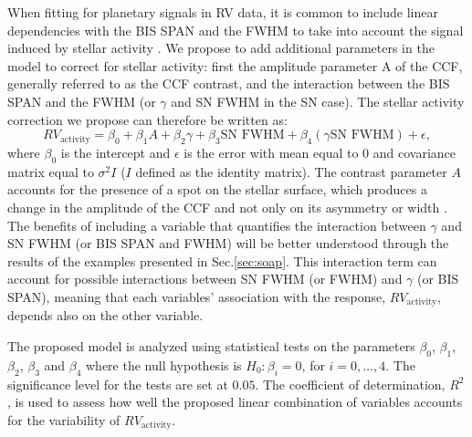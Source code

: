 \documentclass{aa}
\def\logrhk{$\log$(R$^{\prime}_{HK}$)}
\begin{document}
When fitting for planetary signals in RV data, it is common to include linear dependencies with the BIS SPAN and the FWHM to take into account the signal induced by stellar activity \citep[e.g.][]{Dumusque:2017aa,Feng:2017aa}.
We propose to add additional parameters in the model to correct for stellar activity: first the amplitude parameter A of the CCF, generally referred to as the CCF contrast, and the interaction between the BIS SPAN and the FWHM (or $\gamma$ and SN FWHM in the SN case). The stellar activity correction we propose can therefore be written as:
%
\begin{equation}
RV_{\text{activity}}= \beta_{0} + \beta_{1} A + \beta_{2} \gamma + \beta_{3} \text{SN FWHM} + \beta_{4} (\gamma  \text{SN FWHM})+\epsilon,
\label{eq:RV:correction}
\end{equation}
%
where $\beta_{0}$ is the intercept and $\epsilon$ is the error with mean equal to $0$ and covariance matrix equal to $\sigma^{2}I$ ($I$ defined as the identity matrix). 
The contrast parameter $A$ accounts for the presence of a spot on the stellar surface, which produces a change in the amplitude of the CCF and not only on its asymmetry or width \citep[see e.g. Fig. 2 in ][]{Dumusque-2014b}.
The benefits of including a variable that quantifies the interaction between $\gamma$ and SN FWHM (or BIS SPAN and FWHM) will be better understood through the results of the examples presented in Sec.\ref{sec:soap}. 
This interaction term can account for possible interactions between SN FWHM (or FWHM) and $\gamma$ (or BIS SPAN), meaning that each  variables' association with the response, $RV_{\text{activity}}$, depends also on the other variable.

The proposed model is analyzed using statistical tests on the parameters $\beta_{0}$, $\beta_{1}$, $\beta_{2}$, $\beta_{3}$ and $\beta_{4}$ where the null hypothesis is $H_{0}: \beta_{i}=0$, for $i=0,\dots,4$. The significance level for the tests are set at $0.05$. The coefficient of determination, $R^2$, is used to assess how well the proposed linear combination of variables accounts for the variability of $RV_{\text{activity}}$. 
\end{document}
